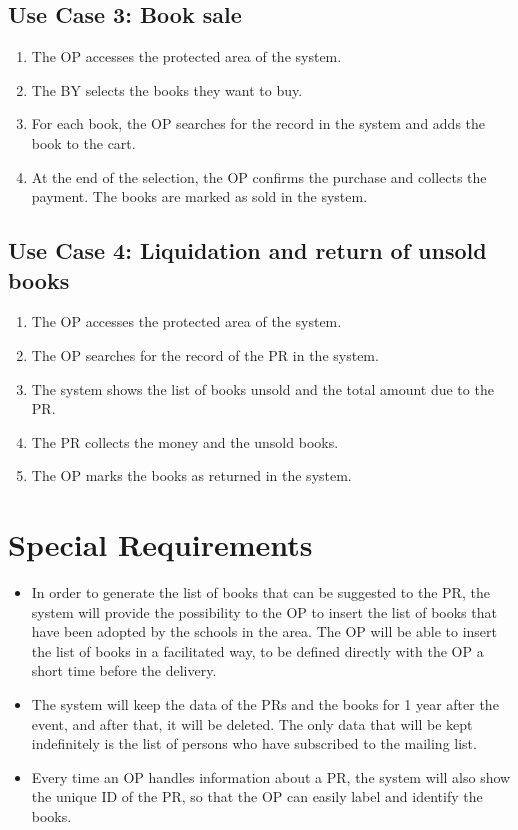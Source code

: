 \subsection{Use Case 3: Book sale}

\begin{enumerate}
    \item The OP accesses the protected area of the system.
    \item The BY selects the books they want to buy.
    \item For each book, the OP searches for the record in the system and adds the book to the cart.
    \item At the end of the selection, the OP confirms the purchase and collects the payment. The books are marked as sold in the system.
\end{enumerate}

\subsection{Use Case 4: Liquidation and return of unsold books}

\begin{enumerate}
    \item The OP accesses the protected area of the system.
    \item The OP searches for the record of the PR in the system.
    \item The system shows the list of books unsold and the total amount due to the PR.
    \item The PR collects the money and the unsold books.
    \item The OP marks the books as returned in the system.
\end{enumerate}

\section{Special Requirements}

\begin{itemize}
    \item In order to generate the list of books that can be suggested to the PR, the system will provide the possibility to the OP to insert the list of books that have been adopted by the schools in the area. The OP will be able to insert the list of books in a facilitated way, to be defined directly with the OP a short time before the delivery.
    \item The system will keep the data of the PRs and the books for 1 year after the event, and after that, it will be deleted. The only data that will be kept indefinitely is the list of persons who have subscribed to the mailing list.
    \item Every time an OP handles information about a PR, the system will also show the unique ID of the PR, so that the OP can easily label and identify the books.
\end{itemize}

